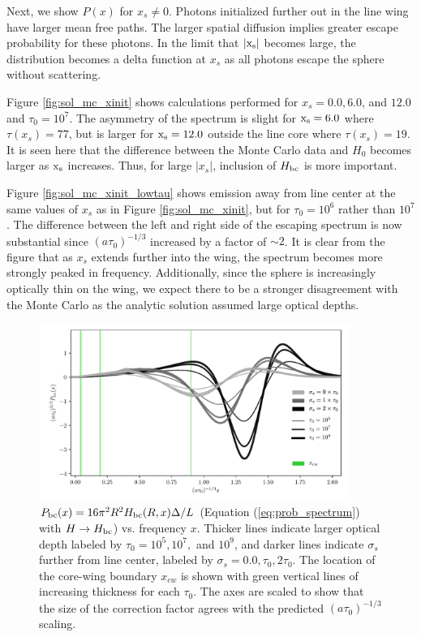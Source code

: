 \documentclass[linenumbers]{aastex63}
\begin{document}
Next, we show $P(x)$ for $x_s \neq 0$. Photons initialized further out in the line wing have larger mean free paths. The larger spatial diffusion implies greater escape probability for these photons. In the limit that $|\rm x_s|$ becomes large, the distribution becomes a delta function at $x_s$ as all photons escape the sphere without scattering. 

Figure \ref{fig:sol_mc_xinit} shows calculations performed for $x_s = 0.0, 6.0$, and $12.0$ and $\tau_0=10^7$. The asymmetry of the spectrum is slight for $\rm x_s = 6.0$ where $\tau(x_s)=77$, but is larger for $\rm x_s=12.0$ outside the line core where $\tau(x_s)=19$. It is seen here that the difference between the Monte Carlo data and $H_0$ becomes larger as $\rm x_s$ increases. Thus, for large $|x_s|$, inclusion of $H_{\rm bc}$ is more important.

Figure \ref{fig:sol_mc_xinit_lowtau} shows emission away from line center at the same values of $x_s$ as in Figure \ref{fig:sol_mc_xinit}, but for $\tau_0=10^6$ rather than $10^7$. The difference between the left and right side of the escaping spectrum is now substantial since $(a\tau_0)^{-1/3}$ increased by a factor of ${\sim}2$. It is clear from the figure that as $x_s$ extends further into the wing, the spectrum becomes more strongly peaked in frequency. Additionally, since the sphere is increasingly optically thin on the wing, we expect there to be a stronger disagreement with the Monte Carlo as the analytic solution assumed large optical depths.

\begin{figure}
    \centering
    \includegraphics[width=0.9\textwidth]{xinit.pdf}
    \caption{$P_{\rm bc}(x) = 16\pi^2R^2H_{\rm bc}(R, x)\Delta/L$ (Equation (\ref{eq:prob_spectrum}) with $H \rightarrow H_{\rm bc}$) vs. frequency $x$. Thicker lines indicate larger optical depth labeled by $\tau_0=10^5, 10^7,$ and $10^9$, and darker lines indicate $\sigma_s$ further from line center, labeled by $\sigma_s=0.0, \tau_0, 2\tau_0$. The location of the core-wing boundary $x_{cw}$ is shown with green vertical lines of increasing thickness for each $\tau_0$. The axes are scaled to show that the size of the correction factor agrees with the predicted $(a\tau_0)^{-1/3}$ scaling.}
    \label{fig:xinit}
\end{figure}
\end{document}

